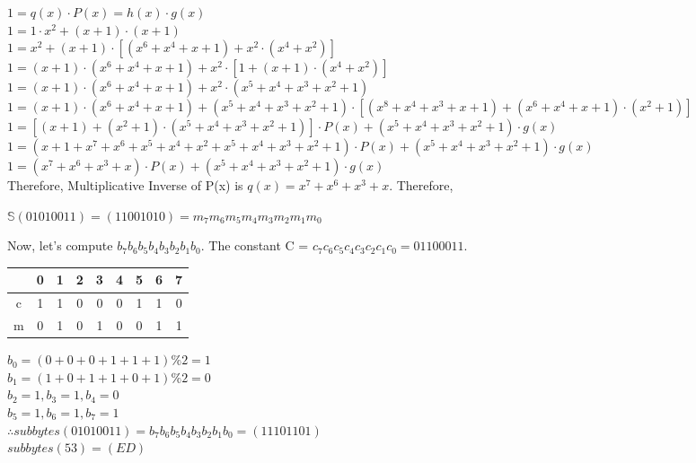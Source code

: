 \documentclass[11pt]{article}
\begin{document}
    $1 = q(x)\cdot P(x) = h(x) \cdot g(x)$\\
    \vspace{2mm}
    $1 = 1 \cdot x^2 + (x+1) \cdot (x+1)$\\
    \vspace{2mm}
    $1 = x^2 + (x + 1) \cdot [(x^6 + x^4 + x + 1) + x^2 \cdot (x^4 + x^2)]$\\
    \vspace{2mm}
    $1 = (x+1) \cdot (x^6 + x^4 + x + 1) + x^2 \cdot [1 + (x+1) \cdot (x^4 + x^2)]$\\
    \vspace{2mm}
    $1 = (x+1) \cdot (x^6 + x^4 + x + 1) + x^2 \cdot (x^5 + x^4 + x^3 + x^2 + 1)$\\
    \vspace{2mm}
    $1 = (x+1) \cdot (x^6 + x^4 + x + 1) + (x^5 + x^4 + x^3 + x^2 + 1) \cdot [(x^8 + x^4 + x^3 + x + 1) + (x^6 + x^4 + x + 1) \cdot (x^2 + 1)] $\\
    \vspace{2mm}
    $1 = [(x + 1) + (x^2 + 1) \cdot (x^5 + x^4 + x^3 + x^2 + 1)] \cdot P(x) + (x^5 + x^4 + x^3 + x^2 + 1) \cdot g(x)$\\
    \vspace{2mm}
    $1 = (x + 1 + x^7 + x^6 + x^5 + x^4 + x^2 + x^5 + x^4 + x^3 + x^2 + 1) \cdot P(x) + (x^5 + x^4 + x^3 + x^2 + 1) \cdot g(x)$\\
    \vspace{2mm}
    $1 = (x^7 + x^6 + x^3 + x) \cdot P(x) + (x^5 + x^4 + x^3 + x^2 + 1) \cdot g(x)$\\
Therefore, Multiplicative Inverse of P(x) is $q(x) = x^7 + x^6 + x^3 + x$. Therefore,
\begin{center}
    $\mathbb{S}(01010011) = (11001010) = m_7m_6m_5m_4m_3m_2m_1m_0$
\end{center}
Now, let's compute $b_7b_6b_5b_4b_3b_2b_1b_0$. The constant C = $c_7c_6c_5c_4c_3c_2c_1c_0 = 01100011$.
\begin{center}
    \begin{tabular}{|c|c|c|c|c|c|c|c|c|}
        \hline
         & 0 & 1 & 2 & 3 & 4 & 5 & 6 & 7 \\ \hline
        c & 1 & 1 & 0 & 0 & 0 & 1 & 1 & 0  \\ \hline
        m & 0 & 1 & 0 & 1 & 0 & 0 & 1 & 1  \\ \hline
    \end{tabular}
\end{center}
\begin{center}
    $b_0 = (0 + 0 + 0 + 1 + 1 + 1) \% 2 = 1$\\
    $b_1 = (1 + 0 + 1 + 1 + 0 + 1) \%2 = 0$\\
    $b_2 = 1, b_3 = 1, b_4 = 0$\\
    $b_5 = 1, b_6 = 1, b_7 = 1$\\
    $\therefore subbytes(01010011) = b_7b_6b_5b_4b_3b_2b_1b_0 = (11101101)$\\
    $subbytes(53) = (ED)$
\end{center}
\end{document}
